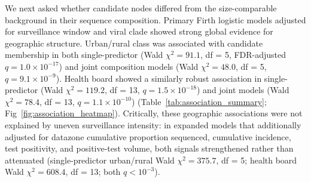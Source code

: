 \documentclass[10pt,letterpaper]{article}
\begin{document}
We next asked whether candidate nodes differed from the size-comparable background in their sequence composition. Primary Firth logistic models adjusted for surveillance window and viral clade showed strong global evidence for geographic structure. Urban/rural class was associated with candidate membership in both single-predictor (Wald $\chi^2 = 91.1$, df = 5, FDR-adjusted $q = 1.0\times10^{-17}$) and joint composition models (Wald $\chi^2 = 48.0$, df = 5, $q = 9.1\times10^{-9}$). Health board showed a similarly robust association in single-predictor (Wald $\chi^2 = 119.2$, df = 13, $q = 1.5\times10^{-18}$) and joint models (Wald $\chi^2 = 78.4$, df = 13, $q = 1.1\times10^{-10}$) (Table~\ref{tab:association_summary}; Fig~\ref{fig:association_heatmap}). Critically, these geographic associations were not explained by uneven surveillance intensity: in expanded models that additionally adjusted for datazone cumulative proportion sequenced, cumulative incidence, test positivity, and positive-test volume, both signals strengthened rather than attenuated (single-predictor urban/rural Wald $\chi^2 = 375.7$, df = 5; health board Wald $\chi^2 = 608.4$, df = 13; both $q < 10^{-3}$).
\end{document}
